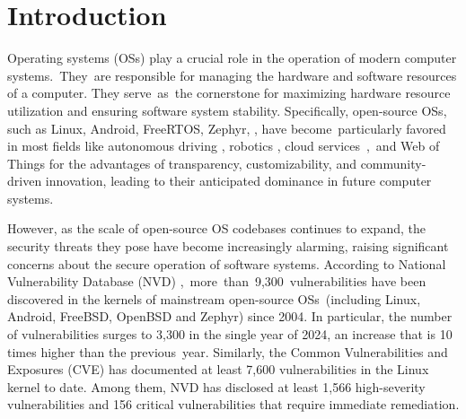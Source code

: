 
\section{Introduction}

Operating systems (OSs) play a crucial role in the operation of modern computer systems.~They~are responsible for managing the hardware and software resources of a computer. 
They serve~as~the cornerstone for maximizing hardware resource utilization and ensuring software system stability. Specifically, open-source OSs, such as Linux, Android, FreeRTOS, Zephyr, \etc, have become~particularly favored in most fields like autonomous driving \cite{Apollo,Chen2022ParallelDO}, robotics \cite{ROS2}, cloud services~\cite{Li2015LeveragingLC},~and Web of Things \cite{Liu2023LeveragingAO,Sun2023SCTAPSS} for the advantages of transparency, customizability, and community-driven innovation, leading to their anticipated dominance in future computer systems.

However, as the scale of open-source OS codebases continues to expand, the security threats they pose have become increasingly alarming, raising significant concerns about the secure operation of software systems. According to National Vulnerability Database (NVD) \cite{NVD},~more~than~9,300~vulnerabilities have been discovered in the kernels of mainstream open-source OSs~(including Linux, Android, FreeBSD, OpenBSD and Zephyr) since 2004. In particular, the number of vulnerabilities surges to 3,300 in the single year of 2024, an increase that is 10 times higher than the previous~year. %
Similarly, the Common Vulnerabilities and Exposures (CVE) \cite{cve} has documented at least 7,600 vulnerabilities in the Linux kernel to date. Among them, NVD has disclosed at least 1,566 high-severity vulnerabilities and 156 critical vulnerabilities that require immediate remediation. 


